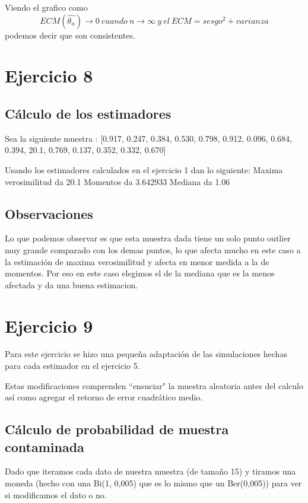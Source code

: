 \documentclass[a4paper]{article}
\begin{document}
Viendo el grafico como \[ECM(\hat{\theta_{n}}) \rightarrow 0 \ cuando \ n \rightarrow \infty \ y \ el\ ECM = sesgo^2 + varianza\] podemos decir que son consistentes. 

\section{Ejercicio 8}
\subsection{Cálculo de los estimadores}
Sea la siguiente muestra : [0.917, 0.247, 0.384, 0.530, 0.798, 0.912, 0.096, 0.684, 0.394, 20.1, 0.769, 0.137, 0.352, 0.332, 0.670] \newline

Usando los estimadores calculados en el ejercicio 1 dan lo siguiente: \newline
Maxima verosimilitud da 20.1 \newline
Momentos da 3.642933 \newline
Mediana da 1.06 


\subsection{Observaciones}
Lo que podemos observar es que esta muestra dada tiene un solo punto outlier muy grande comparado con los demas puntos, lo que afecta mucho en este caso a la estimación de maxima verosimilitud y afecta en menor medida a la de momentos. Por eso en este caso elegimos el de la mediana que es la menos afectada y da una buena estimacion.
 
\section{Ejercicio 9}
Para este ejercicio se hizo una pequeña adaptación de las simulaciones hechas para cada estimador en el ejercicio 5. 

Estas modificaciones comprenden ``ensuciar" la muestra aleatoria antes del calculo así como agregar el retorno de error cuadrático medio. 

\subsection{Cálculo de probabilidad de muestra contaminada}
Dado que iteramos cada dato de nuestra muestra (de tamaño 15) y tiramos una moneda (hecho con una Bi(1, 0,005) que es lo mismo que un Ber(0,005)) para ver si modificamos el dato o no. 
\end{document}
